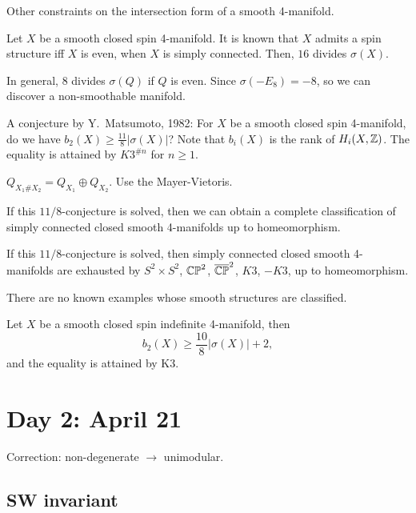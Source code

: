 \documentclass{../../../small}
\begin{document}
Other constraints on the intersection form of a smooth 4-manifold.
\begin{theorem}
Let $X$ be a smooth closed spin 4-manifold.
It is known that $X$ admits a spin structure iff $X$ is even, when $X$ is simply connected.
Then, $16$ divides $\sigma(X)$.
\end{theorem}

In general, $8$ divides $\sigma(Q)$ if $Q$ is even.
Since $\sigma(-E_8)=-8$, so we can discover a non-smoothable manifold.

A conjecture by Y.~Matsumoto, 1982: For $X$ be a smooth closed spin 4-manifold, do we have $b_2(X)\ge\frac{11}8|\sigma(X)|$? Note that $b_i(X)$ is the rank of $H_i(X,\mathbb{Z})$.
The equality is attained by $K3^{\#n}$ for $n\ge1$.
\begin{exercise}
$Q_{X_1\# X_2}=Q_{X_1}\oplus Q_{X_2}$.
Use the Mayer-Vietoris.
\end{exercise}

If this $11/8$-conjecture is solved, then we can obtain a complete classification of simply connected closed smooth 4-manifolds up to homeomorphism.

\begin{exercise}
If this $11/8$-conjecture is solved, then simply connected closed smooth 4-manifolds are exhausted by $S^2\times S^2$, $\mathbb{CP}^2$, $\overline{\mathbb{CP}}^2$, $K3$, $-K3$, up to homeomorphism.
\end{exercise}

There are no known examples whose smooth structures are classified.

\begin{theorem}
Let $X$ be a smooth closed spin indefinite 4-manifold, then
\[b_2(X)\ge\frac{10}8|\sigma(X)|+2,\]
and the equality is attained by K3.
\end{theorem}







\newpage
\section{Day 2: April 21}


Correction: non-degenerate $\to$ unimodular.
\subsection{SW invariant}
\end{document}
